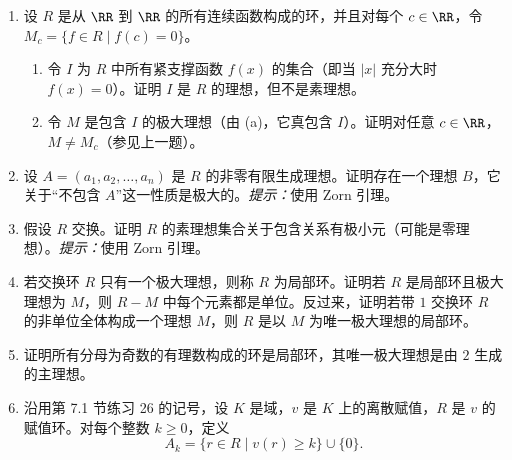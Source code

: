 \begin{enumerate}[label=\arabic*.]
	\begin{enumerate}[label=(\alph*)]
		\item 证明若 $M$ 是 $R$ 的任意极大理想，则存在实数 $c\in[0,1]$ 使 $M=M_c$。
		\item 证明若 $b,c$ 是 $[0,1]$ 中不同点，则 $M_b\neq M_c$。
		\item 证明 $M_c$ 不等于由 $x-c$ 生成的主理想。
		\item 证明 $M_c$ 不是有限生成理想。
	\end{enumerate}
	上一题说明，闭区间 $[0,1]$ 的点与 $[0,1]$ 上连续函数环 $R$ 的极大理想集合之间有双射 $c\mapsto M_c$。对 $\RR$ 的任意子集 $X$，更一般地，对任意完全正则拓扑空间 $X$，映射 $c\mapsto M_c$ 是从 $X$ 到 $R$ 的极大理想集合的单射，其中 $R$ 是 $X$ 上有界连续实值函数环，$M_c$ 是在 $c$ 处为零的函数理想。令 $\beta(X)$ 为 $R$ 的极大理想集合。可以在 $\beta(X)$ 上定义一个拓扑，使得把 $X$ 与其在 $\beta(X)$ 中的像识别后，$X$（带原拓扑）成为 $\beta(X)$ 的子空间；而且 $\beta(X)$ 是紧空间，称为 $X$ 的 Stone--\v Cech 紧化。
	\item 设 $R$ 是从 $\RR$ 到 $\RR$ 的所有连续函数构成的环，并且对每个 $c\in\RR$，令 $M_c=\{f\in R\mid f(c)=0\}$。
	\begin{enumerate}[label=(\alph*)]
		\item 令 $I$ 为 $R$ 中所有紧支撑函数 $f(x)$ 的集合（即当 $|x|$ 充分大时 $f(x)=0$）。证明 $I$ 是 $R$ 的理想，但不是素理想。
		\item 令 $M$ 是包含 $I$ 的极大理想（由 (a)，它真包含 $I$）。证明对任意 $c\in\RR$，$M\neq M_c$（参见上一题）。
	\end{enumerate}
	\item 设 $A=(a_1,a_2,\ldots,a_n)$ 是 $R$ 的非零有限生成理想。证明存在一个理想 $B$，它关于“不包含 $A$”这一性质是极大的。\emph{提示：}使用 Zorn 引理。
	\item 假设 $R$ 交换。证明 $R$ 的素理想集合关于包含关系有极小元（可能是零理想）。\emph{提示：}使用 Zorn 引理。
	\item 若交换环 $R$ 只有一个极大理想，则称 $R$ 为局部环。证明若 $R$ 是局部环且极大理想为 $M$，则 $R-M$ 中每个元素都是单位。反过来，证明若带 $1$ 交换环 $R$ 的非单位全体构成一个理想 $M$，则 $R$ 是以 $M$ 为唯一极大理想的局部环。
	\item 证明所有分母为奇数的有理数构成的环是局部环，其唯一极大理想是由 $2$ 生成的主理想。
	\item 沿用第 7.1 节练习 26 的记号，设 $K$ 是域，$v$ 是 $K$ 上的离散赋值，$R$ 是 $v$ 的赋值环。对每个整数 $k\geq0$，定义
	\[
	A_k=\{r\in R\mid v(r)\geq k\}\cup\{0\}.
	\]
	\begin{enumerate}[label=(\alph*)]

\end{enumerate}
\end{enumerate}

